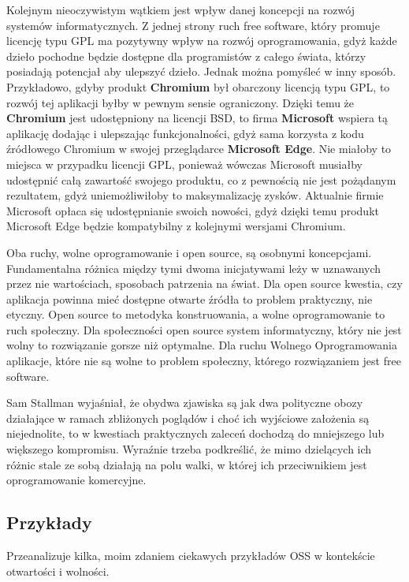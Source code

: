 \documentclass{article}
\begin{document}
Kolejnym nieoczywistym wątkiem jest wpływ danej koncepcji na rozwój systemów informatycznych. Z jednej strony ruch free software, który promuje licencję typu GPL ma pozytywny wpływ na rozwój oprogramowania, gdyż każde dzieło pochodne będzie dostępne dla programistów z całego świata, którzy posiadają potencjał aby ulepszyć dzieło. Jednak można pomyśleć w inny sposób. Przykładowo, gdyby produkt \textbf{Chromium} był obarczony licencją typu GPL, to rozwój tej aplikacji byłby w pewnym sensie ograniczony. Dzięki temu że \textbf{Chromium} jest udostępniony na licencji BSD, to firma \textbf{Microsoft} wspiera tą aplikację dodając i ulepszając funkcjonalności, gdyż sama korzysta z kodu źródłowego Chromium w swojej przeglądarce \textbf{Microsoft Edge}\cite{microsoft.edge}. Nie miałoby to miejsca w przypadku licencji GPL, ponieważ wówczas Microsoft musiałby udostępnić całą zawartość swojego produktu, co z pewnością nie jest pożądanym rezultatem, gdyż uniemożliwiłoby to maksymalizację zysków. Aktualnie firmie Microsoft opłaca się udostępnianie swoich nowości, gdyż dzięki temu produkt Microsoft Edge będzie kompatybilny z kolejnymi wersjami Chromium.

Oba ruchy, wolne oprogramowanie i open source, są osobnymi koncepcjami. Fundamentalna różnica między tymi dwoma inicjatywami leży w uznawanych przez nie wartościach, sposobach patrzenia na świat. Dla open source kwestia, czy aplikacja powinna mieć dostępne otwarte źródła to problem praktyczny, nie etyczny. Open source to metodyka konstruowania, a wolne oprogramowanie to ruch społeczny. Dla społeczności open source system informatyczny, który nie jest wolny to rozwiązanie gorsze niż optymalne. Dla ruchu Wolnego Oprogramowania aplikacje, które nie są wolne to problem społeczny, którego rozwiązaniem jest free software\cite{Kotula}.

Sam Stallman wyjaśniał, że obydwa zjawiska są jak dwa polityczne obozy działające w ramach zbliżonych poglądów i choć ich wyjściowe założenia są niejednolite, to w kwestiach praktycznych zaleceń dochodzą do mniejszego lub większego kompromisu. Wyraźnie trzeba podkreślić, że mimo dzielących ich różnic stale ze sobą działają na polu walki, w której ich przeciwnikiem jest oprogramowanie komercyjne\cite{Kotula}.

\subsection{Przykłady}

Przeanalizuje kilka, moim zdaniem ciekawych przykładów OSS w kontekście otwartości i wolności.
\end{document}
